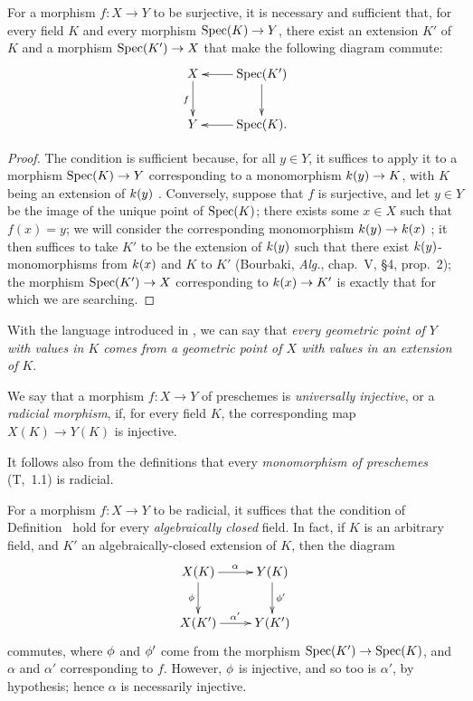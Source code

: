 \begin{proposition}[3.5.3]
\label{I.3.5.3}
For a morphism $f:X\to Y$ to be surjective, it is necessary and sufficient that, for every field $K$ and every morphism $\Spec(K)\to Y$, there exist an extension $K'$ of $K$ and a morphism $\Spec(K')\to X$ that make the following diagram commute:
\[
  \xymatrix{
    X\ar[d]_f &
    \Spec(K')\ar[l]\ar[d]\\
    Y &
    \Spec(K).\ar[l]
  }
\]
\end{proposition}

\begin{proof}
The condition is sufficient because, for all $y\in Y$, it suffices to apply it to a morphism $\Spec(K)\to Y$ corresponding to a monomorphism $\kres(y)\to K$, with $K$ being an extension of $k(y)$ .
Conversely, suppose that $f$ is surjective, and let $y\in Y$ be the image of the unique point of $\operatorname{Spec}(K)$; there exists some $x\in X$ such that $f(x)=y$; we will consider the corresponding monomorphism $\kres(y)\to\kres(x)$ ; it then suffices to take $K'$ to be the extension of $k(y)$ such that there exist $k(y)$-monomorphisms from $k(x)$ and $K$ to $K'$ (Bourbaki, \emph{Alg.}, chap.~V, §4, prop.~2); the morphism $\Spec(K')\to X$ corresponding to $\kres(x)\to K'$ is exactly that for which we are searching.
\end{proof}

With the language introduced in , we can say that \emph{every geometric point of $Y$ with values in $K$ comes from a geometric point of $X$ with values in an extension of $K$}.

\begin{definition}[3.5.4]
\label{I.3.5.4}
We say that a morphism $f:X\to Y$ of preschemes is \emph{universally injective}, or a \emph{radicial morphism}, if, for every field $K$, the corresponding map $X(K)\to Y(K)$ is injective.
\end{definition}

It follows also from the definitions that every \emph{monomorphism of preschemes} (T,~1.1) is radicial.

\begin{env}[3.5.5]
\label{I.3.5.5}
For a morphism $f:X\to Y$ to be radicial, it suffices that the condition of Definition~ hold for every \emph{algebraically closed} field.
In fact, if $K$ is an arbitrary field, and $K'$ an algebraically-closed extension of $K$, then the diagram
\[
  \xymatrix{
    X(K)\ar[r]^\alpha\ar[d]_\vphi &
    Y(K)\ar[d]^{\vphi'}\\
    X(K')\ar[r]^{\alpha'} &
    Y(K')
  }
\]
commutes, where $\phi$ and $\phi'$ come from the morphism $\Spec(K')\to\Spec(K)$, and $\alpha$ and $\alpha'$ corresponding to $f$.
However, $\phi$ is injective, and so too is $\alpha'$, by hypothesis; hence $\alpha$ is necessarily injective.
\end{env}

